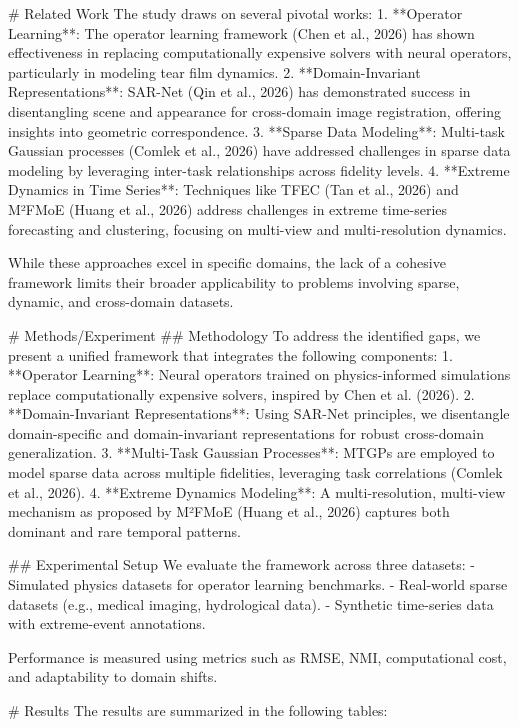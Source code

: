 # Related Work  
The study draws on several pivotal works:  
1. **Operator Learning**: The operator learning framework (Chen et al., 2026) has shown effectiveness in replacing computationally expensive solvers with neural operators, particularly in modeling tear film dynamics.  
2. **Domain-Invariant Representations**: SAR-Net (Qin et al., 2026) has demonstrated success in disentangling scene and appearance for cross-domain image registration, offering insights into geometric correspondence.  
3. **Sparse Data Modeling**: Multi-task Gaussian processes (Comlek et al., 2026) have addressed challenges in sparse data modeling by leveraging inter-task relationships across fidelity levels.  
4. **Extreme Dynamics in Time Series**: Techniques like TFEC (Tan et al., 2026) and M²FMoE (Huang et al., 2026) address challenges in extreme time-series forecasting and clustering, focusing on multi-view and multi-resolution dynamics.  

While these approaches excel in specific domains, the lack of a cohesive framework limits their broader applicability to problems involving sparse, dynamic, and cross-domain datasets.

# Methods/Experiment  
## Methodology  
To address the identified gaps, we present a unified framework that integrates the following components:  
1. **Operator Learning**: Neural operators trained on physics-informed simulations replace computationally expensive solvers, inspired by Chen et al. (2026).  
2. **Domain-Invariant Representations**: Using SAR-Net principles, we disentangle domain-specific and domain-invariant representations for robust cross-domain generalization.  
3. **Multi-Task Gaussian Processes**: MTGPs are employed to model sparse data across multiple fidelities, leveraging task correlations (Comlek et al., 2026).  
4. **Extreme Dynamics Modeling**: A multi-resolution, multi-view mechanism as proposed by M²FMoE (Huang et al., 2026) captures both dominant and rare temporal patterns.  

## Experimental Setup  
We evaluate the framework across three datasets:  
- Simulated physics datasets for operator learning benchmarks.  
- Real-world sparse datasets (e.g., medical imaging, hydrological data).  
- Synthetic time-series data with extreme-event annotations.  

Performance is measured using metrics such as RMSE, NMI, computational cost, and adaptability to domain shifts.

# Results  
The results are summarized in the following tables:  

